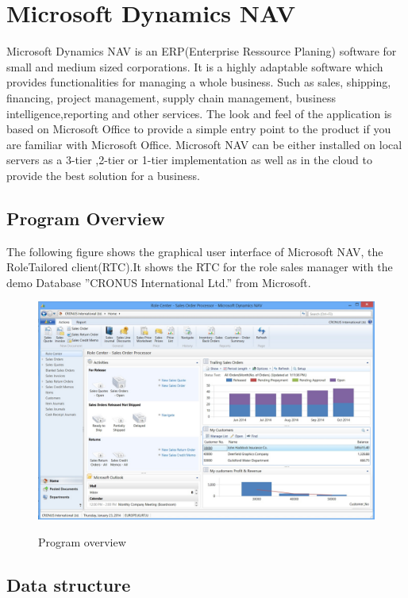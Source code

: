   \section{Microsoft Dynamics NAV}
  Microsoft Dynamics NAV is an ERP(Enterprise Ressource Planing) software for small and medium sized corporations. It is a highly adaptable software which provides functionalities for managing a whole business. Such as sales, shipping, financing, project management, supply chain management, business intelligence,reporting and other services. 
  The look and feel of the application is based on Microsoft Office to provide a simple entry point to the product if you are familiar with Microsoft Office. Microsoft NAV can be either installed on local servers as a 3-tier ,2-tier or 1-tier implementation as well as in the cloud to provide the best solution for a business.\cite{navOver} 
  
  \subsection{Program Overview}
  The following figure shows the graphical user interface of Microsoft NAV, the RoleTailored client(RTC).It shows the RTC for the role sales manager with the demo Database ''CRONUS International Ltd.'' from Microsoft. 
  \begin{figure}[htbp]
  \centering
  \includegraphics[width=\textwidth,height=\textheight,keepaspectratio]{graphics/navSales.jpg}
  \caption{Program overview}\cite{azureOver}
  \end{figure}
  \newpage
  
  \subsection{Data structure}
